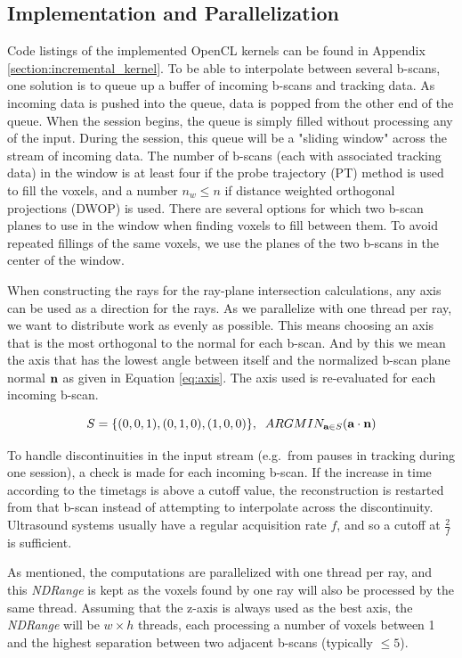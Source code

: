 \subsection{Implementation and Parallelization}
	\label{section:incr_hq_impl}
	
	Code listings of the implemented OpenCL kernels can be found in Appendix \ref{section:incremental_kernel}. To be able to interpolate between several b-scans, one solution is to queue up a buffer of incoming b-scans and tracking data. As incoming data is pushed into the queue, data is popped from the other end of the queue. When the session begins, the queue is simply filled without processing any of the input. During the session, this queue will be a "sliding window" across the stream of incoming data. The number of b-scans (each with associated tracking data) in the window is at least four if the probe trajectory (PT) method is used to fill the voxels, and a number $n_w \leq n$ if distance weighted orthogonal projections (DWOP) is used. There are several options for which two b-scan planes to use in the window when finding voxels to fill between them. To avoid repeated fillings of the same voxels, we use the planes of the two b-scans in the center of the window.
	
	When constructing the rays for the ray-plane intersection calculations, any axis can be used as a direction for the rays. As we parallelize with one thread per ray, we want to distribute work as evenly as possible. This means choosing an axis that is the most orthogonal to the normal for each b-scan. And by this we mean the axis that has the lowest angle between itself and the normalized b-scan plane normal $\textbf{n}$ as given in Equation \ref{eq:axis}. The axis used is re-evaluated for each incoming b-scan.

\begin{equation}
	\label{eq:axis}
	S = \{(0,0,1), (0,1,0), (1,0,0)\}, \;\; ARGMIN_{\textbf{a}\in S}(\textbf{a} \cdot \textbf{n})
\end{equation}

	To handle discontinuities in the input stream (e.g.\ from pauses in tracking during one session), a check is made for each incoming b-scan. If the increase in time according to the timetags is above a cutoff value, the reconstruction is restarted from that b-scan instead of attempting to interpolate across the discontinuity. Ultrasound systems usually have a regular acquisition rate $f$, and so a cutoff at $\frac{2}{f}$ is sufficient.
	
	As mentioned, the computations are parallelized with one thread per ray, and this \textit{NDRange} is kept as the voxels found by one ray will also be processed by the same thread. Assuming that the z-axis is always used as the best axis, the \textit{NDRange} will be $w \times h$ threads, each processing a number of voxels between 1 and the highest separation between two adjacent b-scans (typically $\leq 5$). 